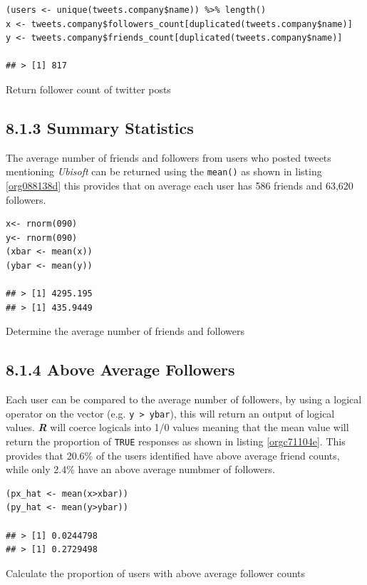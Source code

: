 \documentclass[11pt]{article}
\begin{document}
\begin{listing}[htbp]
\begin{verbatim}
(users <- unique(tweets.company$name)) %>% length()
x <- tweets.company$followers_count[duplicated(tweets.company$name)]
y <- tweets.company$friends_count[duplicated(tweets.company$name)]

## > [1] 817
\end{verbatim}
\caption{\label{orgd40993d}Return follower count of twitter posts}
\end{listing}


\subsection{8.1.3 Summary Statistics}
\label{sec:orge45d8dc}
The average number of friends and followers from users who posted tweets mentioning \emph{Ubisoft} can be returned using the \texttt{mean()} as shown in listing \ref{org088138d}
this provides that on average each user has 586 friends and 63,620 followers.

\begin{listing}[htbp]
\begin{verbatim}
x<- rnorm(090)
y<- rnorm(090)
(xbar <- mean(x))
(ybar <- mean(y))

## > [1] 4295.195
## > [1] 435.9449
\end{verbatim}
\caption{\label{org088138d}Determine the average number of friends and followers}
\end{listing}

\subsection{8.1.4 Above Average Followers}
\label{sec:org0d26979}
Each user can be compared to the average number of followers, by using a logical
operator on the vector (e.g. \texttt{y > ybar}), this will return an output of logical
values. \textbf{\emph{R}} will coerce logicals into 1/0 values meaning that the mean value
will return the proportion of \texttt{TRUE} responses as shown in listing \ref{orgc71104e}. This
provides that 20.6\% of the users identified have above average friend counts, while only 2.4\% have an above average numbmer of followers.

\begin{listing}[htbp]
\begin{verbatim}
(px_hat <- mean(x>xbar))
(py_hat <- mean(y>ybar))

## > [1] 0.0244798
## > [1] 0.2729498
\end{verbatim}
\caption{\label{orgc71104e}Calculate the proportion of users with above average follower counts}
\end{listing}
\end{document}
